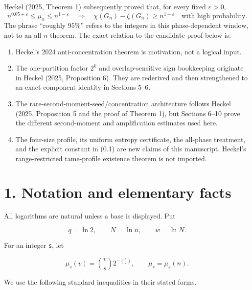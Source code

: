 \documentclass[
  11pt,
  a4paper,
]{article}
\providecommand{\tightlist}{%
  \setlength{\itemsep}{0pt}\setlength{\parskip}{0pt}}
\begin{document}
Heckel (2025, Theorem 1) subsequently proved that, for every fixed
\(\varepsilon>0\), \[
n^{0.05+\varepsilon}\le\mu_\alpha\le n^{1-\varepsilon}
\quad\Longrightarrow\quad
\chi(G_n)-\zeta(G_n)\ge n^{1-\varepsilon}
\quad\text{with high probability}.
\] The phrase ``roughly \(95\%\)'' refers to the integers in this
phase-dependent window, not to an all-\(n\) theorem. The exact relation
to the candidate proof below is:

\begin{enumerate}
\def\labelenumi{\arabic{enumi}.}
\tightlist
\item
  Heckel's 2024 anti-concentration theorem is motivation, not a logical
  input.
\item
  The one-partition factor \(2^k\) and overlap-sensitive sign
  bookkeeping originate in Heckel (2025, Proposition 6). They are
  rederived and then strengthened to an exact component identity in
  Sections 5--6.
\item
  The rare-second-moment-seed/concentration architecture follows Heckel
  (2025, Proposition 5 and the proof of Theorem 1), but Sections 6--10
  prove the different second-moment and amplification estimates used
  here.
\item
  The four-size profile, its uniform entropy certificate, the all-phase
  treatment, and the explicit constant in (0.1) are new claims of this
  manuscript. Heckel's range-restricted tame-profile existence theorem
  is not imported.
\end{enumerate}

\section{1. Notation and elementary
facts}\label{notation-and-elementary-facts}

All logarithms are natural unless a base is displayed. Put

\[
 q=\ln2,\qquad N=\ln n,\qquad w=\ln N.                    \tag{1.1}
\]

For an integer \texttt{s}, let

\[
 \mu_s(v)=\binom vs2^{-\binom s2},\qquad \mu_s=\mu_s(n). \tag{1.2}
\]

We use the following standard inequalities in their stated forms.
\end{document}

